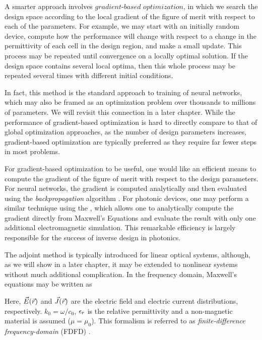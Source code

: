 A smarter approach involves $\textit{gradient-based optimization}$, in which we search the design space according to the local gradient of the figure of merit with respect to each of the parameters.
For example, we may start with an initially random device, compute how the performance will change with respect to a change in the permittivity of each cell in the design region, and make a small update.
This process may be repeated until convergence on a locally optimal solution.
If the design space contains several local optima, then this whole process may be repeated several times with different initial conditions.

In fact, this method is the standard approach to training of neural networks, which may also be framed as an optimization problem over thousands to millions of parameters.
We will revisit this connection in a later chapter.
While the performance of gradient-based optimization is hard to directly compare to that of global optimization approaches, as the number of design parameters increases, gradient-based optimization are typically preferred as they require far fewer steps in most problems.

For gradient-based optimization to be useful, one would like an efficient means to compute the gradient of the figure of merit with respect to the design parameters.
For neural networks, the gradient is computed analytically and then evaluated using the \textit{backpropagation} algorithm \cite{rumelhart_learning_1985}.
For photonic devices, one may perform a similar technique using the , which allows one to analytically compute the gradient directly from Maxwell's Equations and evaluate the result with only one additional electromagnetic simulation.
This remarkable efficiency is largely responsible for the success of inverse design in photonics.

The adjoint method is typically introduced for linear optical systems, although, as we will show in a later chapter, it may be extended to nonlinear systems without much additional complication.
In the frequency domain, Maxwell's equations may be written as

%
Here, $\vec{E}(\vec{r})$ and $\vec{J}(\vec{r})$ are the electric field and electric current distributions, respectively. $k_0 = \omega/c_0$, $\epsilon_r$ is the relative permittivity and a non-magnetic material is assumed ($\mu = \mu_0$).
This formalism is referred to as \textit{finite-difference frequency-domain} (FDFD) \cite{shin2012choice, taflove2000computational}.

